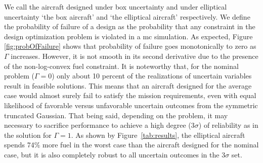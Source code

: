 We call the aircraft designed under box uncertainty and under elliptical uncertainty `the box aircraft'
and `the elliptical aircraft' respectively. We
define the probability of failure of a design as the probability that any constraint
in the design optimization problem is violated in a \gls{mc} simulation.
As expected, Figure \ref{fig:probOfFailure} shows that probability of failure goes monotonically
to zero as $\Gamma$ increases. However, it is not smooth in its second derivative due to the
presence of the non-log-convex fuel constraint.
It is noteworthy that, for the nominal problem ($\Gamma = 0$) only about 10 percent of the realizations of
uncertain variables result in feasible solutions.
This means that an aircraft designed for the average case would almost surely
fail to satisfy the mission requirements, even with equal likelihood of favorable versus
unfavorable uncertain outcomes from the symmetric truncated Gaussian.
That being said, depending on the problem, it may necessary to sacrifice
performance to achieve a high degree ($3\sigma$) of
reliability as in the solution for $\Gamma = 1$. As shown by Figure~\ref{tab:results},
the elliptical aircraft spends 74\% more fuel
in the worst case than the aircraft designed for the nominal case, but it
is also completely robust to all uncertain outcomes in the $3\sigma$ set.

